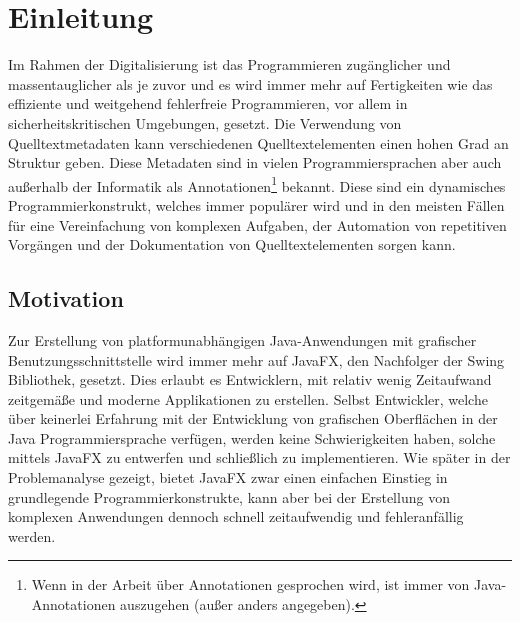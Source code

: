 \chapter{Einleitung}
\label{einleitung}
Im Rahmen der Digitalisierung ist das Programmieren zugänglicher und massentauglicher als je zuvor und es wird immer mehr auf Fertigkeiten wie das effiziente und weitgehend fehlerfreie Programmieren, vor allem in sicherheitskritischen Umgebungen, gesetzt. Die Verwendung von Quelltextmetadaten kann verschiedenen Quelltextelementen einen hohen Grad an Struktur geben. Diese Metadaten sind in vielen Programmiersprachen aber auch außerhalb der Informatik als Annotationen\footnote{Wenn in der Arbeit über Annotationen gesprochen wird, ist immer von Java-Annotationen auszugehen (außer anders angegeben).} bekannt. Diese sind ein dynamisches Programmierkonstrukt, welches immer populärer wird und in den meisten Fällen für eine Vereinfachung von komplexen Aufgaben, der Automation von repetitiven Vorgängen und der Dokumentation von Quelltextelementen sorgen kann.
\section{Motivation}
\label{motivation}
Zur Erstellung von platformunabhängigen Java-Anwendungen mit grafischer Benutzungsschnittstelle wird immer mehr auf JavaFX, den Nachfolger der Swing Bibliothek, gesetzt. Dies erlaubt es Entwicklern, mit relativ wenig Zeitaufwand zeitgemäße und moderne Applikationen zu erstellen. Selbst Entwickler, welche über keinerlei Erfahrung mit der Entwicklung von grafischen Oberflächen in der Java Programmiersprache verfügen, werden keine Schwierigkeiten haben, solche mittels JavaFX zu entwerfen und schließlich zu implementieren. Wie später in der Problemanalyse gezeigt, bietet JavaFX zwar einen einfachen Einstieg in grundlegende Programmierkonstrukte, kann aber bei der Erstellung von komplexen Anwendungen dennoch schnell zeitaufwendig und fehleranfällig werden.
